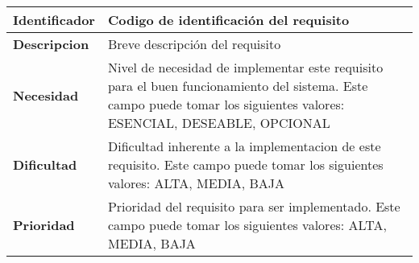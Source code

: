 \begin{center}
    \begin{tabular}{|p{2.6cm}|p{12cm}|}
    \hline
    \textbf{Identificador} & Codigo de identificación del requisito\\
    \hline
    \textbf{Descripcion} & Breve descripción del requisito\\
    \hline
    \textbf{Necesidad} & Nivel de necesidad de implementar este requisito para el buen funcionamiento del sistema. Este campo puede tomar los siguientes valores: ESENCIAL, DESEABLE, OPCIONAL\\
    \hline
    \textbf{Dificultad} & Dificultad inherente a la implementacion de este requisito. Este campo puede tomar los siguientes valores: ALTA, MEDIA, BAJA\\
    \hline
    \textbf{Prioridad} & Prioridad del requisito para ser implementado. Este campo puede tomar los siguientes valores: ALTA, MEDIA, BAJA\\
    \hline
    \end{tabular}
\end{center}
